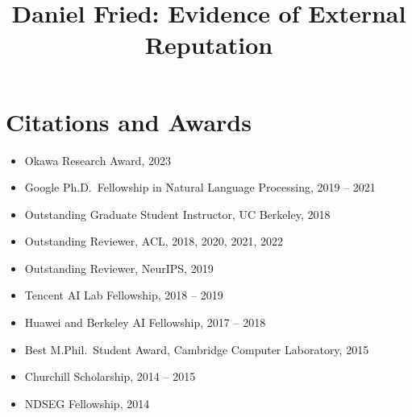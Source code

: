 \documentclass[11pt]{article}
\title{\vspace{-4em}Daniel Fried: Evidence of External Reputation\vspace{-0.5em}}
\date{}
\begin{document}
\maketitle

\section*{Citations and Awards}
\begin{itemize}
    \item Okawa Research Award, 2023 
    \item Google Ph.D.\ Fellowship in Natural Language Processing, 2019 -- 2021 
    \item Outstanding Graduate Student Instructor, UC Berkeley, 2018 
    \item Outstanding Reviewer, ACL, 2018, 2020, 2021, 2022 
    \item Outstanding Reviewer, NeurIPS, 2019 
    \item Tencent AI Lab Fellowship, 2018 -- 2019 
    \item Huawei and Berkeley AI Fellowship, 2017 -- 2018 
    \item Best M.Phil.\ Student Award, Cambridge Computer Laboratory, 2015 
    \item Churchill Scholarship, 2014 -- 2015 
    \item NDSEG Fellowship, 2014 
\end{itemize}
\end{document}
